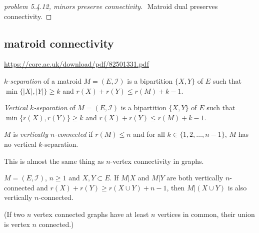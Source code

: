 \documentclass[12pt]{article}
\begin{document}
\begin{proof}[problem 5.4.12, minors preserve connectivity]
    $ $
    \newline
    Matroid dual preserves connectivity.
\end{proof}
\subsection{matroid connectivity}
\url{https://core.ac.uk/download/pdf/82501331.pdf}

\emph{$k$-separation} of a matroid $M=(E,\mathcal I)$ is a bipartition $\{X,Y\}$ of $E$ such that $\min\{|X|,|Y|\}\geq k$ and $r(X)+r(Y)\leq r(M)+k-1$.

\emph{Vertical $k$-separation} of $M=(E,\mathcal I)$ is a bipartition $\{X,Y\}$ of $E$ such that $\min\{r(X),r(Y)\} \geq k$ and $r(X)+r(Y)\leq r(M)+k-1$.

$M$ is \emph{vertically $n$-connected} if $r(M)\leq n$ and for all $k\in\{1,2,\dots,n-1\}$, $M$ has no vertical $k$-separation.

This is almost the same thing as $n$-vertex connectivity in graphs.


\begin{theorem}
    $M=(E,\mathcal I)$, $n\geq 1$ and $X,Y\subset E$. If $M|X$ and $M|Y$ are both vertically $n$-connected and $r(X)+r(Y)\geq r(X\cup Y)+n-1$, then $M|(X\cup Y)$ is also vertically $n$-connected.
\end{theorem}

(If two $n$ vertex connected graphs have at least $n$ vertices in common, their union is vertex $n$ connected.)
\end{document}
